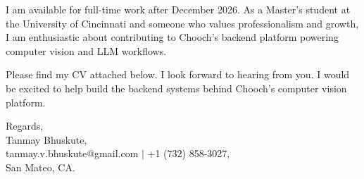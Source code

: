 \documentclass[11pt]{letter}
\begin{document}
\begin{letter}{}
I am available for full-time work after December 2026. As a Master's student at the University of Cincinnati and someone who values professionalism and growth, I am enthusiastic about contributing to Chooch's backend platform powering computer vision and LLM workflows.

Please find my CV attached below. I look forward to hearing from you. I would be excited to help build the backend systems behind Chooch's computer vision platform.

{\setlength{\parskip}{0pt}
Regards,\\
Tanmay Bhuskute,\\
tanmay.v.bhuskute@gmail.com $\mid$ +1 (732) 858-3027,\\
San Mateo, CA.
}

\end{letter}
\end{document}
